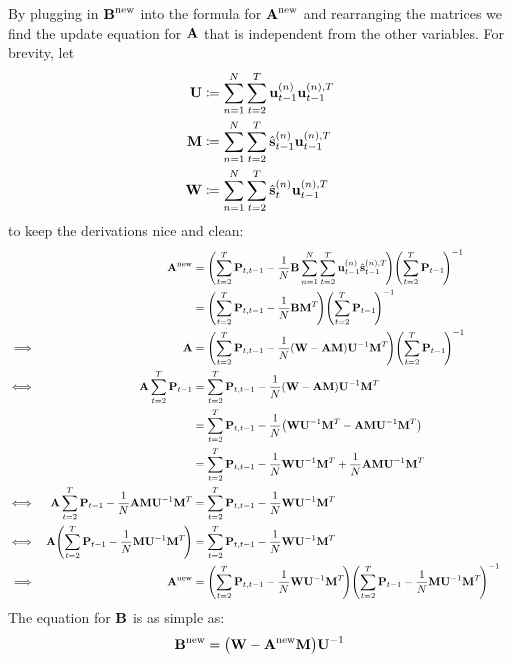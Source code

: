 		By plugging in \( \boldsymbol{\mathrm{B}}^{\mathrm{new}} \) into the formula for \( \boldsymbol{\mathrm{A}}^{\mathrm{new}} \) and rearranging the matrices we find the update equation for \( \boldsymbol{\mathrm{A}} \) that is independent from the other variables. For brevity, let
		\begin{align*}
			\boldsymbol{\mathrm{U}} &\coloneqq \sum_{n = 1}^{N} \sum_{t = 2}^{T} \boldsymbol{\mathrm{u}}_{t - 1}^{(n)} \boldsymbol{\mathrm{u}}_{t - 1}^{(n), T} \\
			\boldsymbol{\mathrm{M}} &\coloneqq \sum_{n = 1}^{N} \sum_{t = 2}^{T} \hat{\boldsymbol{\mathrm{s}}}_{t - 1}^{(n)} \boldsymbol{\mathrm{u}}_{t - 1}^{(n), T} \\
			\boldsymbol{\mathrm{W}} &\coloneqq \sum_{n = 1}^{N} \sum_{t = 2}^{T} \hat{\boldsymbol{\mathrm{s}}}_t^{(n)} \boldsymbol{\mathrm{u}}_{t - 1}^{(n), T}
		\end{align*}
		to keep the derivations nice and clean:
		\begin{align*}
			&& \mat{A}^\new
				&= \Bigg(\! \sum_{t = 2}^{T} \mat{P}_{t, t - 1} - \frac{1}{N} \mat{B} \sum_{n = 1}^{N} \sum_{t = 2}^{T} \vec{u}_{t - 1}^{(n)} \hat{\vec{s}}_{t - 1}^{(n), T} \!\Bigg) \Bigg(\! \sum_{t = 2}^{T} \mat{P}_{t - 1} \!\Bigg)^{-1} & \\
			&&	&= \Bigg(\! \sum_{t = 2}^{T} \mat{P}_{t, t - 1} - \frac{1}{N} \mat{B} \mat{M}^T \!\Bigg) \Bigg(\! \sum_{t = 2}^{T} \mat{P}_{t - 1} \!\Bigg)^{-1} & \\
			\implies&& \mat{A}
				&= \Bigg(\! \sum_{t = 2}^{T} \mat{P}_{t, t - 1} - \frac{1}{N} (\mat{W} - \mat{A} \mat{M}) \mat{U}^{-1} \mat{M}^T \!\Bigg) \Bigg(\! \sum_{t = 2}^{T} \mat{P}_{t - 1} \!\Bigg)^{-1} & \\
			\iff&& \mat{A} \sum_{t = 2}^{T} \mat{P}_{t - 1}
				&= \sum_{t = 2}^{T} \mat{P}_{t, t - 1} - \frac{1}{N} (\mat{W} - \mat{A} \mat{M}) \mat{U}^{-1} \mat{M}^T & \\
			&&	&= \sum_{t = 2}^{T} \mat{P}_{t, t - 1} - \frac{1}{N} \big( \mat{W} \mat{U}^{-1} \mat{M}^T - \mat{A} \mat{M} \mat{U}^{-1} \mat{M}^T \big) & \\
			&&	&= \sum_{t = 2}^{T} \mat{P}_{t, t - 1} - \frac{1}{N} \mat{W} \mat{U}^{-1} \mat{M}^T + \frac{1}{N} \mat{A} \mat{M} \mat{U}^{-1} \mat{M}^T & \\
			\iff&& \mat{A} \sum_{t = 2}^{T} \mat{P}_{t - 1} - \frac{1}{N} \mat{A} \mat{M} \mat{U}^{-1} \mat{M}^T
				&= \sum_{t = 2}^{T} \mat{P}_{t, t - 1} - \frac{1}{N} \mat{W} \mat{U}^{-1} \mat{M}^T & \\
			\iff&& \mat{A} \Bigg(\! \sum_{t = 2}^{T} \mat{P}_{t - 1} - \frac{1}{N} \mat{M} \mat{U}^{-1} \mat{M}^T \!\Bigg)
				&= \sum_{t = 2}^{T} \mat{P}_{t, t - 1} - \frac{1}{N} \mat{W} \mat{U}^{-1} \mat{M}^T & \\
			\implies&& \mat{A}^\new
				&= \Bigg(\! \sum_{t = 2}^{T} \mat{P}_{t, t - 1} - \frac{1}{N} \mat{W} \mat{U}^{-1} \mat{M}^T \!\Bigg) \Bigg(\! \sum_{t = 2}^{T} \mat{P}_{t - 1} - \frac{1}{N} \mat{M} \mat{U}^{-1} \mat{M}^T \!\Bigg)^{-1} &
		\end{align*}
		The equation for \(\boldsymbol{\mathrm{B}}\) is as simple as:
		\begin{align*}
			\boldsymbol{\mathrm{B}}^{\mathrm{new}} = \big( \boldsymbol{\mathrm{W}} - \boldsymbol{\mathrm{A}}^{\mathrm{new}} \boldsymbol{\mathrm{M}} \big) \boldsymbol{\mathrm{U}}^{-1}
		\end{align*}

